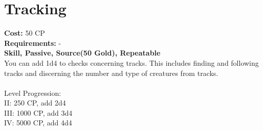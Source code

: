 \section{Tracking}
\textbf{Cost:} 50 CP\\
\textbf{Requirements:} -\\
\textbf{Skill, Passive, Source(50 Gold), Repeatable}\\
You can add 1d4 to checks concerning tracks. This includes finding and following tracks and discerning the number and type of creatures from tracks.\\
\\
Level Progression:\\
II: 250 CP, add 2d4\\
III: 1000 CP, add 3d4\\
IV: 5000 CP, add 4d4\\